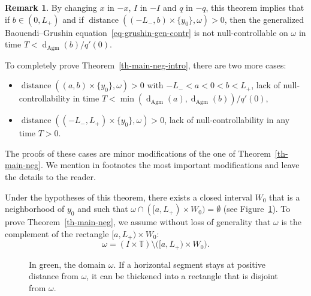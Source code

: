 \documentclass[10pt]{amsart}
\theoremstyle{definition}\newtheorem{defi}[theo]{Definition}\newtheorem{rema}[theo]{Remark}\newtheorem{exam}[theo]{Example}\newtheorem{exem}[theo]{Example}\newtheorem{nota}[theo]{Notation}
\newcommand{\1}{\mathds 1}
\DeclareMathOperator{\distance}{distance}
\newcommand{\dagmon}{\mathop{\mathrm{d}}\nolimits_{\mathrm{Agm}}}
\newcommand{\T}{\mathbb{T}}
\renewcommand{\o}{\omega}
\begin{document}
\begin{rema}\label{rk-main-neg}
By changing $x$ in $-x$, $I$ in $-I$ and $q$ in $-q$, this theorem implies that if $b\in(0,L_+)$ and if $\distance((-L_-,b)\times \{y_0\}, \o) > 0$, then the generalized Baouendi--Grushin equation~\eqref{eq-grushin-gen-contr} is not null-controllable on $\o$ in time $T< \dagmon(b)/q'(0)$.

To completely prove Theorem~\ref{th-main-neg-intro}, there are two more cases:
\begin{itemize}
\item $\distance((a,b)\times\{y_0\}, \o)>0$ with $-L_-< a <0<b<L_+$, lack of null-controllability in time $T< \min(\dagmon(a),\dagmon(b))/q'(0)$,
\item $\distance((-L_-,L_+)\times\{y_0\}, \o)>0$, lack of null-controllability in any time $T>0$.
\end{itemize}
The proofs of these cases are minor modifications of the one of Theorem~\ref{th-main-neg}. We mention in footnotes the most important modifications and leave the details to the reader.
\end{rema}

Under the hypotheses of this theorem, there exists a closed interval $W_0$ that is a neighborhood of $y_0$ and such that $\o \cap ([a,L_+)\times W_0) = \emptyset$ (see Figure~\ref{fig:omega_neg}). To prove Theorem~\ref{th-main-neg}, we assume without loss of generality that $\o$ is the complement of the rectangle $[a,L_+)\times W_0$:
\begin{equation}\label{eq-def-omega}
\o = (I\times \T)\setminus \big([a,L_+)\times W_0\big).
\end{equation}

\begin{figure}[ht]
\centering
{}
\vspace*{-8pt}
\caption{In green, the domain $\omega$. If a horizontal segment stays at positive distance from $\omega$, it can be thickened into a rectangle that is disjoint from $\omega$.}\label{fig:omega_neg}
\end{figure}
\end{document}
